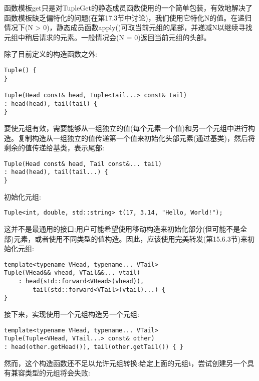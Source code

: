 函数模板get只是对TupleGet的静态成员函数使用的一个简单包装，有效地解决了函数模板缺乏偏特化的问题(在第17.3节中讨论)，我们使用它特化N的值。在递归情况下(N > 0)，静态成员函数apply()可取当前元组的尾部，并递减N以继续寻找元组中稍后请求的元素。一般情况会(N = 0)返回当前元组的头部。


除了目前定义的构造函数之外:

\begin{lstlisting}[style=styleCXX]
Tuple() {
}

Tuple(Head const& head, Tuple<Tail...> const& tail)
: head(head), tail(tail) {
}
\end{lstlisting}

要使元组有效，需要能够从一组独立的值(每个元素一个值)和另一个元组中进行构造。复制构造从一组独立的值传递第一个值来初始化头部元素(通过基类)，然后将剩余的值传递给基类，表示尾部:

\begin{lstlisting}[style=styleCXX]
Tuple(Head const& head, Tail const&... tail)
: head(head), tail(tail...) {
}
\end{lstlisting}

初始化元组:

\begin{lstlisting}[style=styleCXX]
Tuple<int, double, std::string> t(17, 3.14, "Hello, World!");
\end{lstlisting}

这并不是最通用的接口:用户可能希望使用移动构造来初始化部分(但可能不是全部)元素，或者使用不同类型的值构造。因此，应该使用完美转发(第15.6.3节)来初始化元组:

\begin{lstlisting}[style=styleCXX]
template<typename VHead, typename... VTail>
Tuple(VHead&& vhead, VTail&&... vtail)
	: head(std::forward<VHead>(vhead)),
		tail(std::forward<VTail>(vtail)...) {
}
\end{lstlisting}

接下来，实现使用一个元组构造另一个元组:

\begin{lstlisting}[style=styleCXX]
template<typename VHead, typename... VTail>
Tuple(Tuple<VHead, VTail...> const& other)
: head(other.getHead()), tail(other.getTail()) { }
\end{lstlisting}

然而，这个构造函数还不足以允许元组转换:给定上面的元组t，尝试创建另一个具有兼容类型的元组将会失败:

